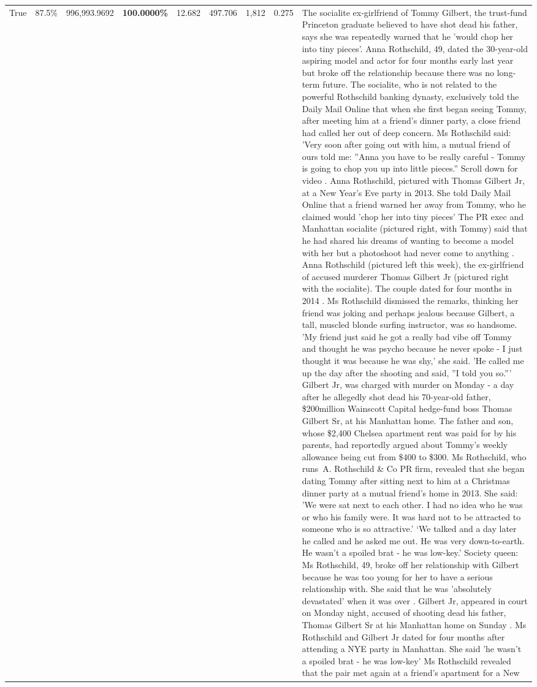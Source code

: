 \begin{table}[H]
\begin{tabular}{lllrlllll}
True & 87.5\% & 996,993.9692 & \bfseries \color{red} 100.0000\% & 12.682 & 497.706 & 1,812 & 0.275 & The socialite ex-girlfriend of Tommy Gilbert, the trust-fund Princeton graduate believed to have shot dead his father, says she was repeatedly warned that he 'would chop her into tiny pieces'. Anna Rothschild, 49, dated the 30-year-old aspiring model and actor for four months early last year but broke off the relationship because there was no long-term future. The socialite, who is not related to the powerful Rothschild banking dynasty, exclusively told the Daily Mail Online that when she first began seeing Tommy, after meeting him at a friend's dinner party, a close friend had called her out of deep concern. Ms Rothschild said: 'Very soon after going out with him, a mutual friend of ours told me: ''Anna you have to be really careful - Tommy is going to chop you up into little pieces.'' Scroll down for video . Anna Rothschild, pictured with Thomas Gilbert Jr, at a New Year's Eve party in 2013. She told Daily Mail Online that a friend warned her away from Tommy, who he claimed would 'chop her into tiny pieces' The PR exec and Manhattan socialite (pictured right, with Tommy) said that he had shared his dreams of wanting to become a model with her but a photoshoot had never come to anything . Anna Rothschild (pictured left this week), the ex-girlfriend of accused murderer Thomas Gilbert Jr (pictured right with the socialite). The couple dated for four months in 2014 . Ms Rothschild dismissed the remarks, thinking her friend was joking and perhaps jealous because Gilbert, a tall, muscled blonde surfing instructor, was so handsome. 'My friend just said he got a really bad vibe off Tommy and thought he was psycho because he never spoke - I just thought it was because he was shy,' she said. 'He called me up the day after the shooting and said, ''I told you so.''' Gilbert Jr, was charged with murder on Monday - a day after he allegedly shot dead his 70-year-old father, \$200million Wainscott Capital hedge-fund boss Thomas Gilbert Sr, at his Manhattan home. The father and son, whose \$2,400 Chelsea apartment rent was paid for by his parents, had reportedly argued about Tommy's weekly allowance being cut from \$400 to \$300. Ms Rothschild, who runs A. Rothschild \& Co PR firm, revealed that she began dating Tommy after sitting next to him at a Christmas dinner party at a mutual friend's home in 2013. She said: 'We were sat next to each other. I had no idea who he was or who his family were. It was hard not to be attracted to someone who is so attractive.' ‘We talked and a day later he called and he asked me out. He was very down-to-earth. He wasn’t a spoiled brat - he was low-key.’ Society queen: Ms Rothschild, 49, broke off her relationship with Gilbert because he was too young for her to have a serious relationship with. She said that he was 'absolutely devastated' when it was over . Gilbert Jr, appeared in court on Monday night, accused of shooting dead his father, Thomas Gilbert Sr at his Manhattan home on Sunday . Ms Rothschild and Gilbert Jr dated for four months after attending a NYE party in Manhattan. She said 'he wasn't a spoiled brat - he was low-key' Ms Rothschild revealed that the pair met again at a friend’s apartment for a New 
\end{tabular}
\end{table}
